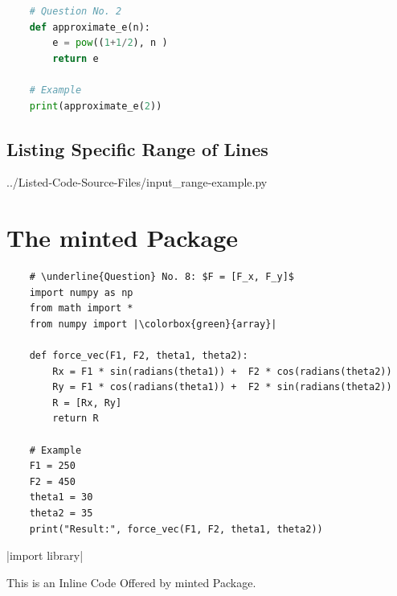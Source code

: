 \documentclass{article}
\begin{document}
	\bigskip
	\lipsum[1]
	\bigskip
	
	\begin{lstlisting}[style=PythonCode,
					   name=PyBlock,
					   language=Python,
					   frame = lbr,
					 caption=Approximate Euler Number.]
	%\phantom{-----------}%
	# Question No. 2
	def approximate_e(n):
   		e = pow((1+1/2), n )
    	return e
	
	# Example
	print(approximate_e(2))
	\end{lstlisting}
	
	\pagebreak
	
	\subsection{Listing Specific Range of Lines}			\lstset{showlines=true}
	
					 {../Listed-Code-Source-Files/input_range-example.py}
					 
	
	\section{The minted Package}
	\begin{verbatim}
	# \underline{Question} No. 8: $F = [F_x, F_y]$
	import numpy as np
	from math import *
	from numpy import |\colorbox{green}{array}|
	
	def force_vec(F1, F2, theta1, theta2):
	    Rx = F1 * sin(radians(theta1)) +  F2 * cos(radians(theta2))
	    Ry = F1 * cos(radians(theta1)) +  F2 * sin(radians(theta2))
	    R = [Rx, Ry]
	    return R
	
	# Example
	F1 = 250 
	F2 = 450
	theta1 = 30
	theta2 = 35
	print("Result:", force_vec(F1, F2, theta1, theta2))
	\end{verbatim}
	
	
	\bigskip
	|import library|
	
	This is an Inline Code  Offered by minted Package.
	
\end{document}

